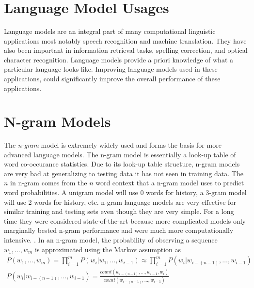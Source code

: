 \documentclass[12pt]{ociamthesis}
\begin{document}
\paragraph{}

\section{Language Model Usages}
\paragraph{}
Language models are an integral part of many computational linguistic applications most notably speech recognition and machine translation. They have also been important in information retrieval tasks, spelling correction, and optical character recognition. Language models provide a priori knowledge of what a particular language looks like. Improving language models used in these applications, could significantly improve the overall performance of these applications. 

\section{N-gram Models}
\paragraph{}
The \emph{n-gram} model is extremely widely used and forms the basis for more advanced language models. The n-gram model is essentially a look-up table of word co-occurance statistics. Due to its look-up table structure, n-gram models are very bad at generalizing to testing data it has not seen in training data. The $n$ in n-gram comes from the $n$ word context that a n-gram model uses to predict word probabilities. A unigram model will use 0 words for history, a 3-gram model will use 2 words for history, etc. n-gram language models are very effective for similar training and testing sets even though they are very simple. For a long time they were considered state-of-the-art because more complicated models only marginally bested n-gram performance and were much more computationally intensive. \cite{Mikolav2012}. 
In an n-gram model, the probability of observing a sequence $w_1, \dots, w_m$ is approximated using the Markov assumption as 
\begin{align}
P(w_1,\dots,w_m) = \prod^{m}_{i=1} P(w_i|w_1,\dots, w_{i-1}) \approx  \prod^{m}_{i=1} P(w_i | w_{i-(n-1)},\dots, w_{i-1}) 
\\P(w_i | w_{i-(n-1)},\dots, w_{i-1}) = \frac{count(w_{i-(n-1)},\dots,w_{i-1},w_i)}{count(w_{i-(n-1)},\dots,w_{i-1})}
\end{align}
\end{document}
